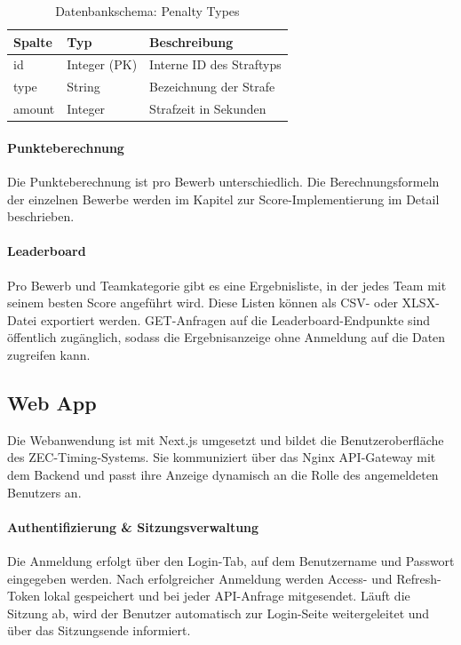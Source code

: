 \begin{table}[h]
    \centering
    \begin{tabular}{|l|l|l|}
        \hline
        \textbf{Spalte} & \textbf{Typ} & \textbf{Beschreibung} \\
        \hline
        id & Integer (PK) & Interne ID des Straftyps \\
        type & String & Bezeichnung der Strafe \\
        amount & Integer & Strafzeit in Sekunden \\
        \hline
    \end{tabular}
    \caption{Datenbankschema: Penalty Types}
    \label{tab:penalty_type_schema}
\end{table}

\paragraph{Punkteberechnung}
Die Punkteberechnung ist pro Bewerb unterschiedlich. Die Berechnungsformeln der 
einzelnen Bewerbe werden im Kapitel zur Score-Implementierung 
im Detail beschrieben.

\paragraph{Leaderboard}
Pro Bewerb und Teamkategorie gibt es eine Ergebnisliste, in der jedes Team mit 
seinem besten Score angeführt wird. Diese Listen können als CSV- oder XLSX-Datei exportiert werden. 
GET-Anfragen auf die Leaderboard-Endpunkte sind öffentlich zugänglich, 
sodass die Ergebnisanzeige ohne Anmeldung auf die Daten zugreifen kann. 

\subsection{Web App}
\label{sec:webapp}

Die Webanwendung ist mit Next.js\cite{nextjs} umgesetzt und bildet die
Benutzeroberfläche des \gls{ZEC}-Timing-Systems. Sie kommuniziert 
über das Nginx \gls{API}-Gateway mit dem Backend und passt ihre Anzeige 
dynamisch an die Rolle des angemeldeten Benutzers an.

\paragraph{Authentifizierung \& Sitzungsverwaltung}

Die Anmeldung erfolgt über den Login-Tab, auf dem Benutzername und Passwort eingegeben werden. 
Nach erfolgreicher Anmeldung werden Access- und Refresh-Token lokal gespeichert und 
bei jeder \gls{API}-Anfrage mitgesendet. Läuft die Sitzung ab, wird der 
Benutzer automatisch zur Login-Seite weitergeleitet und über das 
Sitzungsende informiert.

